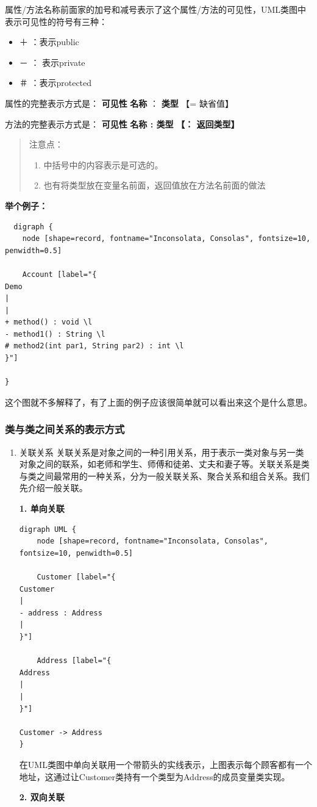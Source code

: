 \documentclass[11pt]{article}
\begin{document}
属性/方法名称前面家的加号和减号表示了这个属性/方法的可见性，UML类图中表示可见性的符号有三种：
\begin{itemize}
\item ＋ ：表示public
\item － ： 表示private
\item ＃ ：表示protected
\end{itemize}

属性的完整表示方式是： \textbf{可见性} \textbf{名称} ： \textbf{类型} 【= 缺省值】

方法的完整表示方式是： \textbf{可见性} \textbf{名称 : 类型} \textbf{【： 返回类型】}

\begin{quote}
注意点：
\begin{enumerate}
\item 中括号中的内容表示是可选的。
\item 也有将类型放在变量名前面，返回值放在方法名前面的做法
\end{enumerate}
\end{quote}


\textbf{举个例子：}
\begin{verbatim}
  digraph {
    node [shape=record, fontname="Inconsolata, Consolas", fontsize=10, penwidth=0.5]

    Account [label="{
Demo
|
|
+ method() : void \l
- method1() : String \l
# method2(int par1, String par2) : int \l 
}"]

}
\end{verbatim}

这个图就不多解释了，有了上面的例子应该很简单就可以看出来这个是什么意思。
\subsubsection{类与类之间关系的表示方式}
\label{sec:orgcc03b7f}
\begin{enumerate}
\item 关联关系
\label{sec:orgb6c8535}
关联关系是对象之间的一种引用关系，用于表示一类对象与另一类对象之间的联系，如老师和学生、师傅和徒弟、丈夫和妻子等。关联关系是类与类之间最常用的一种关系，分为一般关联关系、聚合关系和组合关系。我们先介绍一般关联。

\textbf{1. 单向关联}
\begin{verbatim}
digraph UML {
    node [shape=record, fontname="Inconsolata, Consolas", fontsize=10, penwidth=0.5]

    Customer [label="{
Customer
|
- address : Address 
|
}"]

    Address [label="{
Address
|
|
}"]

Customer -> Address
}
\end{verbatim}

在UML类图中单向关联用一个带箭头的实线表示，上图表示每个顾客都有一个地址，这通过让Customer类持有一个类型为Address的成员变量类实现。

\textbf{2. 双向关联}
\end{enumerate}
\end{document}
